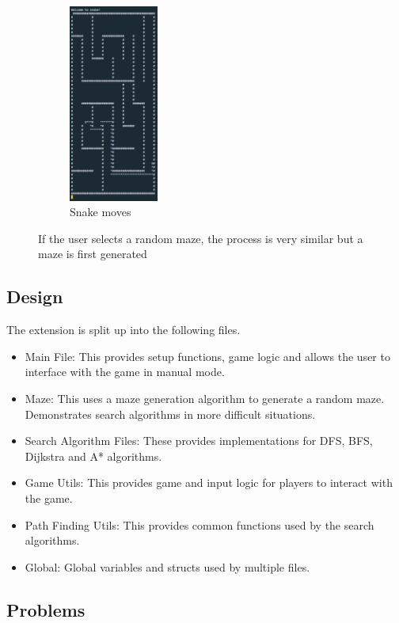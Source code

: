 \documentclass[11pt]{article}
\begin{document}
\begin{figure}[H]
\begin{subfigure}{0.24\textwidth}
\end{subfigure}
\begin{subfigure}{0.24\textwidth}
    \includegraphics[height=6.5cm]{A_Star_Move_Maze}
    \caption{Snake moves}
    \label{fig:subim4}
\end{subfigure}

\caption{If the user selects a random maze, the process is very similar but a maze is first generated}
\label{fig:image3}
\end{figure}

\subsection{Design}

The extension is split up into the following files.
\begin{itemize}
    \item Main File: This provides setup functions, game logic and allows the user to interface with the game in manual mode.
    \item Maze: This uses a maze generation algorithm to generate a random maze. Demonstrates search algorithms in more difficult situations.
    \item Search Algorithm Files: These provides implementations for DFS, BFS, Dijkstra and A* algorithms.
    \item Game Utils: This provides game and input logic for players to interact with the game.
    \item Path Finding Utils: This provides common functions used by the search algorithms.
    \item Global: Global variables and structs used by multiple files.
\end{itemize}

\subsection{Problems}
\end{document}
